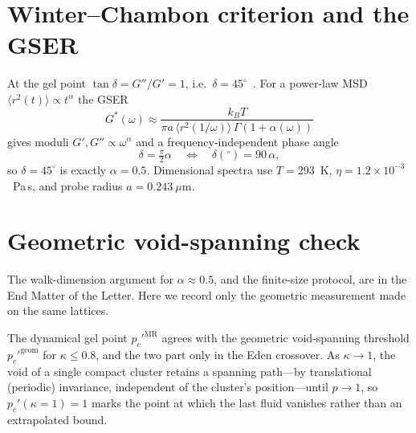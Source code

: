 \documentclass[aps,prl,onecolumn,superscriptaddress,nofootinbib,longbibliography]{revtex4-2}
\newcommand{\msd}{\langle r^2(t)\rangle}
\newcommand{\pcp}{p_c'}
\newcommand{\kap}{\kappa}
\begin{document}
\section{Winter--Chambon criterion and the GSER}
At the gel point $\tan\delta=G''/G'=1$, i.e.\ $\delta=45^{\circ}$~\cite{Winter1987,Chambon1987}.
For a power-law MSD $\msd\propto t^{\alpha}$ the GSER~\cite{Mason1995,Mason2000}
\begin{equation}
  G^*(\omega)\approx\frac{k_BT}{\pi a\,\langle r^2(1/\omega)\rangle\,\Gamma(1+\alpha(\omega))}
\end{equation}
gives moduli $G',G''\propto\omega^{\alpha}$ and a frequency-independent phase angle
\begin{equation}
  \delta=\tfrac{\pi}{2}\alpha \quad\Longleftrightarrow\quad \delta(^{\circ})=90\,\alpha,
\end{equation}
so $\delta=45^{\circ}$ is exactly $\alpha=0.5$. Dimensional spectra use $T=293$~K,
$\eta=1.2\times10^{-3}$~Pa\,s, and probe radius $a=0.243~\mu$m.

\section{Geometric void-spanning check}
The walk-dimension argument for $\alpha\approx0.5$, and the finite-size protocol, are in the End Matter of the Letter. Here we record only the geometric measurement made on the same lattices.

The dynamical gel point $\pcp^{\mathrm{MR}}$ agrees with the geometric void-spanning threshold $\pcp^{\mathrm{geom}}$ for $\kap\le0.8$, and the two part only in the Eden crossover. As $\kap\to1$, the void of a
single compact cluster retains a spanning path---by translational (periodic) invariance, independent
of the cluster's position---until $p\to1$, so $\pcp(\kap{=}1)=1$ marks the point at which the last
fluid vanishes rather than an extrapolated bound.
\end{document}
